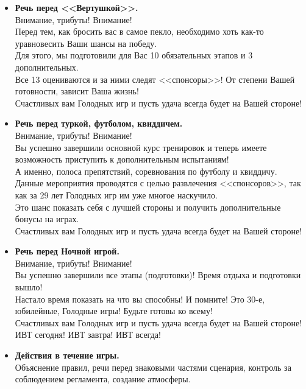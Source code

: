
\begin{itemize}
\item \textbf{Речь перед <<Вертушкой>>.}\\
Внимание, трибуты! Внимание!\\
Перед тем, как бросить вас в самое пекло, необходимо хоть как-то уравновесить Ваши шансы на победу.\\
Для этого, мы подготовили для Вас 10 обязательных этапов и 3 дополнительных.\\
Все 13 оцениваются и за ними следят <<спонсоры>>! От степени Вашей готовности, зависит Ваша жизнь!\\
Счастливых вам Голодных игр и пусть удача всегда будет на Вашей стороне!

\item \textbf{Речь перед туркой, футболом, квиддичем.}\\
Внимание, трибуты! Внимание!\\
Вы успешно завершили основной курс тренировок и теперь имеете возможность приступить к дополнительным испытаниям!\\
А именно, полоса препятствий, соревнования по футболу и квиддичу.\\
Данные мероприятия проводятся с целью развлечения <<спонсоров>>, так как за 29 лет Голодных игр им уже многое наскучило.\\
Это шанс показать себя с лучшей стороны и получить дополнительные бонусы на играх.\\
Счастливых вам Голодных игр и пусть удача всегда будет на Вашей стороне!

\item \textbf{Речь перед Ночной игрой.}\\
Внимание, трибуты! Внимание!\\
Вы успешно завершили все этапы (подготовки)! Время отдыха и подготовки вышло!\\
Настало время показать на что вы способны! И помните! Это 30-е, юбилейные, Голодные игры! Будьте готовы ко всему!\\
Счастливых вам Голодных игр и пусть удача всегда будет на Вашей стороне!\\
ИВТ сегодня! ИВТ завтра! ИВТ всегда!

\item \textbf{Действия в течение игры.}\\
Объяснение правил, речи перед знаковыми частями сценария, контроль за соблюдением регламента, создание атмосферы.
\end{itemize}